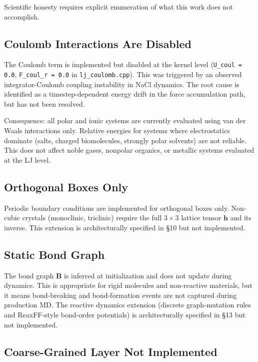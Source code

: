 \documentclass[11pt]{article}
\begin{document}
Scientific honesty requires explicit enumeration of what this work
does not accomplish.

\subsection{Coulomb Interactions Are Disabled}

The Coulomb term is implemented but disabled at the kernel level
(\texttt{U\_coul = 0.0}, \texttt{F\_coul\_r = 0.0} in
\texttt{lj\_coulomb.cpp}).  This was triggered by an observed
integrator-Coulomb coupling instability in NaCl dynamics.  The
root cause is identified as a timestep-dependent energy drift
in the force accumulation path, but has not been resolved.

Consequence: all polar and ionic systems are currently evaluated
using van der Waals interactions only.  Relative energies for
systems where electrostatics dominate (salts, charged biomolecules,
strongly polar solvents) are not reliable.  This does not affect
noble gases, nonpolar organics, or metallic systems evaluated
at the LJ level.

\subsection{Orthogonal Boxes Only}

Periodic boundary conditions are implemented for orthogonal boxes
only.  Non-cubic crystals (monoclinic, triclinic) require the
full $3 \times 3$ lattice tensor $\mathbf{h}$ and its inverse.
This extension is architecturally specified in \S10 but not
implemented.

\subsection{Static Bond Graph}

The bond graph $\mathbf{B}$ is inferred at initialization and
does not update during dynamics.  This is appropriate for rigid
molecules and non-reactive materials, but it means bond-breaking
and bond-formation events are not captured during production MD.
The reactive dynamics extension (discrete graph-mutation rules
and ReaxFF-style bond-order potentials) is architecturally
specified in \S13 but not implemented.

\subsection{Coarse-Grained Layer Not Implemented}
\end{document}
